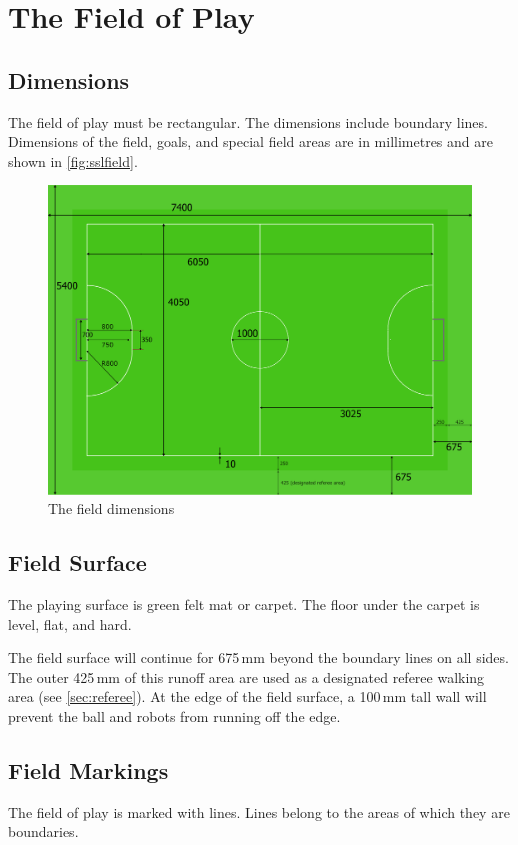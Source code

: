 \section{The Field of Play}\label{sec:field-of-play}

\subsection{Dimensions}
The field of play must be rectangular.
The dimensions include boundary lines.
Dimensions of the field, goals, and special field areas are in millimetres and are shown in \autoref{fig:sslfield}.

\begin{figure}[ht] %
	\centering
	\includegraphics[width=0.8\columnwidth]{img/field_2012_drawing.png}
	\caption{The field dimensions}
	\label{fig:sslfield}
\end{figure}

\subsection{Field Surface}
The playing surface is green felt mat or carpet.
The floor under the carpet is level, flat, and hard.

The field surface will continue for 675\,mm beyond the boundary lines on all sides.
The outer 425\,mm of this runoff area are used as a designated referee walking area (see \autoref{sec:referee}).
At the edge of the field surface, a 100\,mm tall wall will prevent the ball and robots from running off the edge.

\subsection{Field Markings}
The field of play is marked with lines.
Lines belong to the areas of which they are boundaries.

